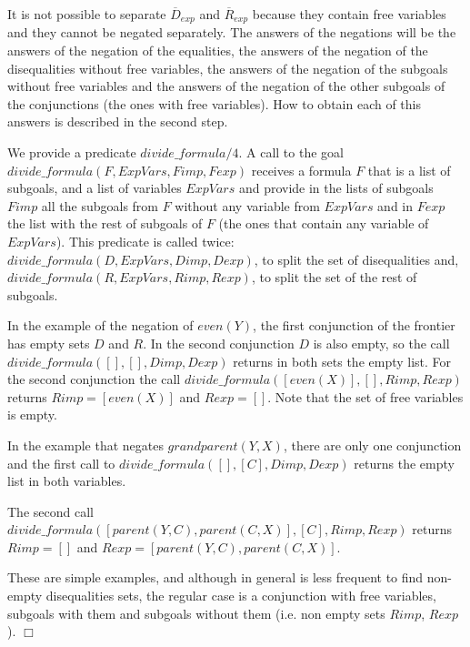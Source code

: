 \documentclass{tlp}
\newcommand{\implementation}[1]{\noindent{\sc Implementation details:}
  #1 $\Box$}
\begin{document}

It is not possible to separate $\overline{D}_{exp}$ and
$\overline{R}_{exp}$ because they contain free variables and
they cannot be negated separately. The answers of the negations
will be the answers of the negation of the equalities, the answers of
the negation of the disequalities without free variables, the answers
of the negation of the subgoals without free variables and the answers
of the negation of the other subgoals of the conjunctions (the ones
with free variables). How to obtain each of this answers is described in the
second step.

\implementation{
We provide a predicate $divide\_formula/4$. A
call to the goal $divide\_formula(F,ExpVars,Fimp,Fexp)$ receives a formula $F$
that is a list of subgoals, and a list of variables $ExpVars$ and provide in
the lists of subgoals $Fimp$ all the subgoals from $F$ without any variable
from $ExpVars$ and in $Fexp$ the list with the rest of subgoals of $F$ (the
ones that contain any variable of $ExpVars$). This predicate is called twice:
 $divide\_formula(D,ExpVars,Dimp,Dexp)$, to split the set of disequalities
and, $divide\_formula(R,ExpVars,Rimp,Rexp)$, to split the set of the
rest of subgoals.

In the example of the negation of $even(Y)$, the first conjunction of the
frontier has empty sets $D$ and $R$. In the second conjunction $D$ is also 
empty, so the call $divide\_formula([],[],Dimp,Dexp)$ returns in both sets the
empty list. For the second conjunction the call
$divide\_formula([even(X)],[],Rimp,Rexp)$ returns $Rimp=[even(X)]$ and
$Rexp=[]$. Note that the set of free variables is empty.

In the example that negates $grandparent(Y,X)$, there are only one conjunction
and the first call to $divide\_formula([],[C],Dimp,Dexp)$ returns the empty
list in both variables. 

The second call $divide\_formula([parent(Y,C),parent(C,X)],[C],Rimp,Rexp)$
returns $Rimp=[]$ and $Rexp=[parent(Y,C),parent(C,X)]$.

These are simple examples, and although in general is less frequent to find
non-empty disequalities sets, the regular case is a conjunction with free
variables, subgoals with them and subgoals without them (i.e. non empty sets
$Rimp$, $Rexp$).
}
\end{document}
